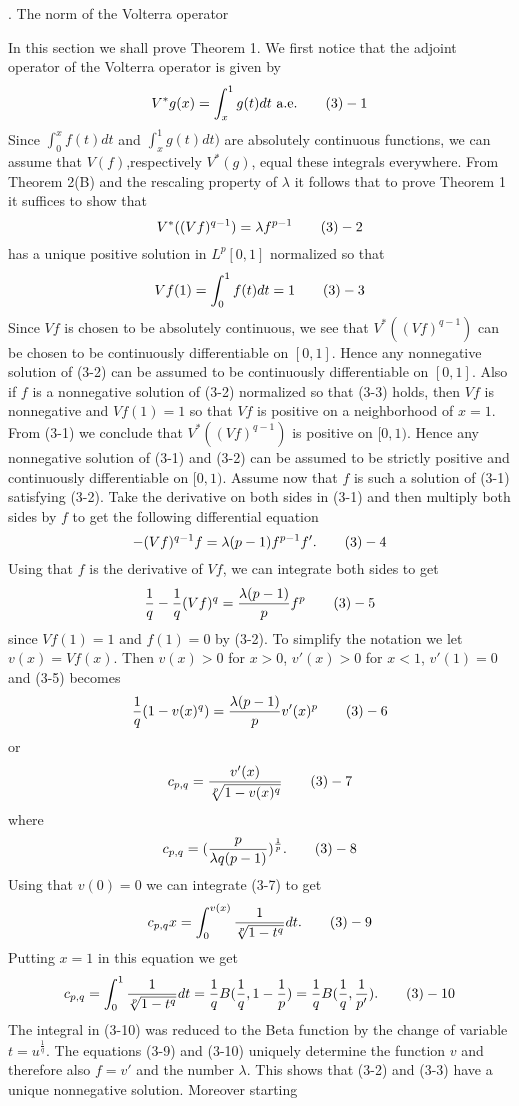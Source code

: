 . The norm of the Volterra operator \endheading

In this section we shall prove Theorem 1. We first notice that the adjoint
operator of the Volterra operator is given by
$$V^*g(x)=\int_x^1 g(t)dt \text{ a.e.} \tag 3-1$$ Since $\int _0^x f(t)dt$ and
$\int _x^1 g(t)dt)$ are absolutely continuous functions, we can assume that
$V(f)$,respectively $V^*(g)$, equal these integrals everywhere. From Theorem
2(B) and the rescaling property of $\lambda$ it follows that to prove Theorem 1
it suffices to show that
$$V^*((Vf)^{q-1})=\lambda f^{p-1}\tag 3-2$$
has a unique positive solution in $L^p[0,1]$ normalized so that
$$Vf(1)=\int _0^1 f(t)dt=1\tag 3-3$$
Since $Vf$ is chosen to be absolutely continuous, we see that $V^*((Vf)^{q-1})$
can be chosen to be continuously differentiable on $[0,1]$. Hence any
nonnegative solution of (3-2) can be assumed to be continuously differentiable
on $[0,1]$. Also if $f$ is a nonnegative solution of (3-2) normalized so that
(3-3) holds, then $Vf$ is nonnegative and $Vf(1)=1$ so that $Vf$ is positive on
a neighborhood of $x=1$. From (3-1) we conclude that $V^*((Vf)^{q-1})$ is
positive on $[0,1)$. Hence any nonnegative solution of (3-1) and (3-2) can be
assumed to be strictly positive  and continuously differentiable on
$[0,1)$. Assume now that $f$ is such a solution of (3-1) satisfying (3-2). Take
the derivative on both sides in (3-1) and then multiply both sides by $f$
to get the following differential equation
$$-(Vf)^{q-1}f=\lambda (p-1)f^{p-1}f'.\tag 3-4$$
Using that $f$ is the derivative of $Vf$, we can integrate both sides to get
$$\frac 1q-\frac 1q (Vf)^{q}=\frac {\lambda (p-1)}p f^p\tag 3-5$$
since $Vf(1)=1$ and $f(1)=0$ by (3-2). To simplify the notation we let
$v(x)=Vf(x)$. Then $v(x)>0$ for $x>0$, $v'(x)>0$ for $x<1$, $v'(1)=0$ and (3-5)
becomes
$$\frac 1q (1-v(x)^q)= \frac {\lambda (p-1)}{p} v'(x)^p \tag 3-6$$
or
$$c_{p,q}= \frac {v'(x)}{\root p \of{1-v(x)^q}} \tag 3-7$$
where
$$c_{p,q}= (\frac p{\lambda q(p-1)})^{\frac 1p}. \tag 3-8$$
Using that $v(0)=0$ we can integrate (3-7) to get 
$$c_{p,q} x =\int _0^{v(x)} \frac 1{\root p \of{ 1-t^q}} dt. \tag 3-9$$
Putting $x=1$ in this equation we get
$$c_{p,q}=\int_0^1 \frac 1{\root p \of{1-t^q}} dt=\frac 1q B(\frac 1q,1- \frac
1p) =\frac 1q B(\frac 1q, \frac 1{p'}). \tag 3-10$$ 
The integral in (3-10) was reduced to the Beta function by the change of
variable $t=u^{\frac 1q}$. The equations (3-9) and (3-10) uniquely determine
the function $v$ and therefore also $f=v'$ and the number $\lambda$. This shows
that  (3-2) and (3-3) have a unique nonnegative solution. Moreover starting
